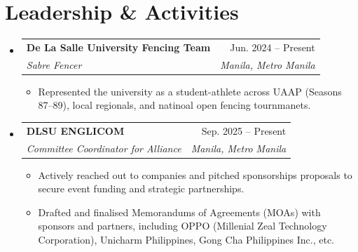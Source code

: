 \documentclass[letterpaper,11pt]{article}
\makeatletter
\newcommand{\resumeItem}[1]{
  \item\small{
    {#1 \vspace{-2pt}}
  }
}
\newcommand{\resumeSubheading}[4]{
  \vspace{-2pt}\item
    \begin{tabular*}{0.97\textwidth}[t]{l@{\extracolsep{\fill}}r}
      \textbf{#1} & #2 \\
      \textit{\small#3} & \textit{\small #4} \\
    \end{tabular*}\vspace{-7pt}
}
\newcommand{\resumeSubHeadingListStart}{\begin{itemize}[leftmargin=0.15in, label={}]}
\newcommand{\resumeSubHeadingListEnd}{\end{itemize}}
\newcommand{\resumeItemListStart}{\begin{itemize}}
\newcommand{\resumeItemListEnd}{\end{itemize}\vspace{-5pt}}
\makeatother
\begin{document}
 
\section{Leadership \& Activities}
    \resumeSubHeadingListStart

    \resumeSubheading
      {De La Salle University Fencing Team}{Jun. 2024 -- Present}
      {Sabre Fencer}{Manila, Metro Manila}
      \resumeItemListStart
        \resumeItem{Represented the university as a student-athlete across UAAP (Seasons 87--89), local regionals, and natinoal open fencing tournmanets.}
      \resumeItemListEnd

    \resumeSubheading
      {DLSU ENGLICOM}{Sep. 2025 -- Present}
      {Committee Coordinator for Alliance}{Manila, Metro Manila}
      \resumeItemListStart
        \resumeItem{Actively reached out to companies and pitched sponsorships proposals to secure event funding and strategic partnerships.}
        \resumeItem{Drafted and finalised Memorandums of Agreements (MOAs) with sponsors and partners, including OPPO (Millenial Zeal Technology Corporation), Unicharm Philippines, Gong Cha Philippines Inc., etc.}
      \resumeItemListEnd
      
    \resumeSubHeadingListEnd


\end{document}
